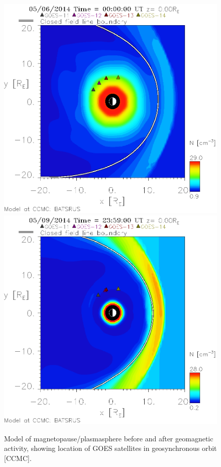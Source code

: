 \documentclass[xcolor={dvipsnames,table}]{beamer}
\begin{document}
\begin{frame}
	\begin{figure}[htp!]
		\centering
		\includegraphics[width=0.45\linewidth]{Figures/idl_798387073825_050215_2_20140506_000000_before}
		\includegraphics[width=0.45\linewidth]{Figures/idl_798605093993_050215_2_20140509_235900_after}
		\caption{Model of magnetopause/plasmasphere before and after geomagnetic activity, showing location of GOES satellites in geosynchronous orbit [CCMC].}
		\label{fig:PlasmapauseLocation}
	\end{figure}
\end{frame}


\end{document}
